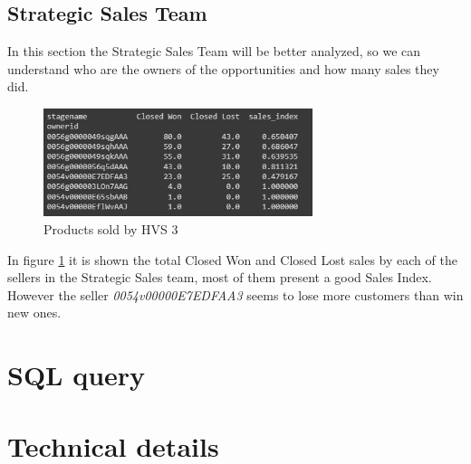 \documentclass[]{report}
\begin{document}
\newpage
\section{Strategic Sales Team}

In this section the Strategic Sales Team will be better analyzed, so we can understand who are the owners of the opportunities and how many sales they did. 

\begin{figure}[htb]
	\centering
	\includegraphics[width=0.70\textwidth]{fig_04_sellers}
	\caption{Products sold by HVS 3}
	\label{fig:fig_04}
\end{figure}

In figure \ref{fig:fig_04} it is shown the total Closed Won and Closed Lost sales by each of the sellers in the Strategic Sales team, most of them present a good Sales Index. However the seller \textit{0054v00000E7EDFAA3} seems to lose more customers than win new ones. 


\chapter{SQL query}

\chapter{Technical details}
\end{document}
